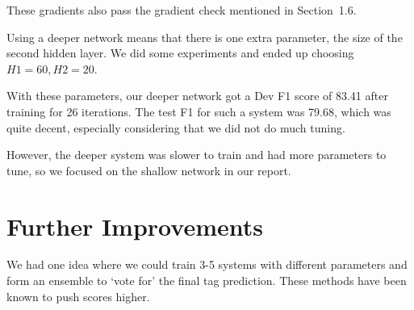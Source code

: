 \documentclass[12pt, twocolumn]{article}
\begin{document}
These gradients also pass the gradient check mentioned in Section~1.6.

Using a deeper network means that there is one extra parameter, the size of the second hidden layer. We did some experiments and ended up choosing $H1=60,H2=20$.

With these parameters, our deeper network got a Dev F1 score of 83.41 after training for 26 iterations. The test F1 for such a system was 79.68, which was quite decent, especially considering that we did not do much tuning.

However, the deeper system was slower to train and had more parameters to tune, so we focused on the shallow network in our report.
\section{Further Improvements}
We had one idea where we could train 3-5 systems with different parameters and form an ensemble to `vote for' the final tag prediction. These methods have been known to push scores higher.
\end{document}
